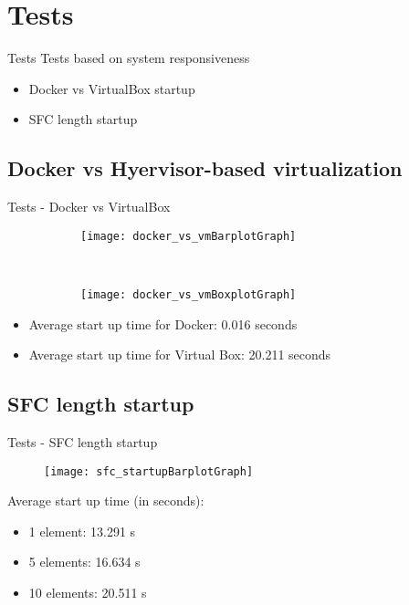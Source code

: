 \section{Tests}
\begin{frame}{Tests}
  Tests based on system responsiveness
  \begin{itemize}
    \item<1-> Docker vs VirtualBox startup
    \item<2-> SFC length startup 
  \end{itemize}
\end{frame}

\subsection{Docker vs Hyervisor-based virtualization}
\begin{frame}{Tests - Docker vs VirtualBox}

  \begin{figure}
    \centering
    \begin{subfigure}[b]{0.45\textwidth}
      \texttt{[image: docker\_vs\_vmBarplotGraph]}
    \end{subfigure}
    ~
    \begin{subfigure}[b]{0.45\textwidth}
      \texttt{[image: docker\_vs\_vmBoxplotGraph]}
    \end{subfigure}
  \end{figure}
  \begin{itemize}
  \item Average start up time for Docker: 0.016 seconds
  \item Average start up time for Virtual Box: 20.211 seconds
  \end{itemize}
\end{frame}

\subsection{SFC length startup}
\begin{frame}{Tests - SFC length startup}
  \begin{figure}
    \centering
    \texttt{[image: sfc\_startupBarplotGraph]}
  \end{figure}

  Average start up time (in seconds):
  \begin{multicols}{2}
    \begin{itemize}
    \item 1 element: 13.291 s
    \item 5 elements: 16.634 s
    \item 10 elements: 20.511 s
    \end{itemize}
  \end{multicols}

  \vfill
\end{frame}
